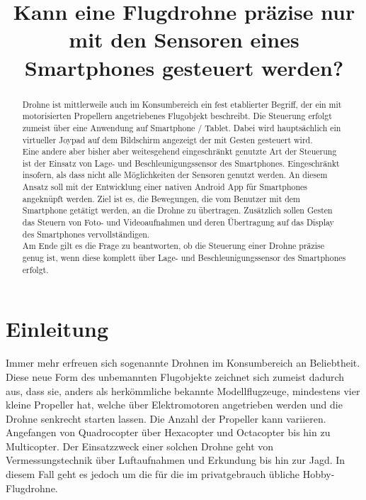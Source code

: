 \documentclass{article}
\title{Kann eine Flugdrohne präzise nur mit den Sensoren eines Smartphones gesteuert werden?}
\begin{document}
\maketitle
\begin{abstract}
Drohne ist mittlerweile auch im Konsumbereich ein fest etablierter Begriff, der ein mit motorisierten Propellern angetriebenes Flugobjekt beschreibt. Die Steuerung erfolgt zumeist über eine Anwendung auf Smartphone / Tablet. Dabei wird hauptsächlich ein virtueller Joypad auf dem Bildschirm angezeigt der mit Gesten gesteuert wird.\\ Eine andere aber bisher aber weitesgehend eingeschränkt genutzte Art der Steuerung ist der Einsatz von Lage- und Beschleunigungssensor des Smartphones. Eingeschränkt insofern, als dass nicht alle Möglichkeiten der Sensoren genutzt werden. An diesem Ansatz soll mit der Entwicklung einer nativen Android App für Smartphones angeknüpft werden. Ziel ist es, die Bewegungen, die vom Benutzer mit dem Smartphone getätigt werden, an die Drohne zu übertragen. Zusätzlich sollen Gesten das Steuern von Foto- und Videoaufnahmen und deren Übertragung auf das Display des Smartphones vervollständigen.\\ Am Ende gilt es die Frage zu beantworten, ob die Steuerung einer Drohne präzise genug ist, wenn diese komplett über Lage- und Beschleunigungssensor des Smartphones erfolgt.

\end{abstract}

\section{Einleitung}
\label{sec:einleitung}
Immer mehr erfreuen sich sogenannte Drohnen im Konsumbereich an Beliebtheit. Diese neue Form des unbemannten Flugobjekte zeichnet sich zumeist dadurch aus, dass sie, anders als herkömmliche bekannte Modellflugzeuge, mindestens vier kleine Propeller hat, welche über Elektromotoren angetrieben werden und die Drohne senkrecht starten lassen. Die Anzahl der Propeller kann variieren. Angefangen von Quadrocopter über Hexacopter und Octacopter bis hin zu Multicopter. Der Einsatzzweck einer solchen Drohne geht von Vermessungstechnik über Luftaufnahmen und Erkundung bis hin zur Jagd. In diesem Fall geht es jedoch um die für die im privatgebrauch übliche Hobby-Flugdrohne.
\end{document}

